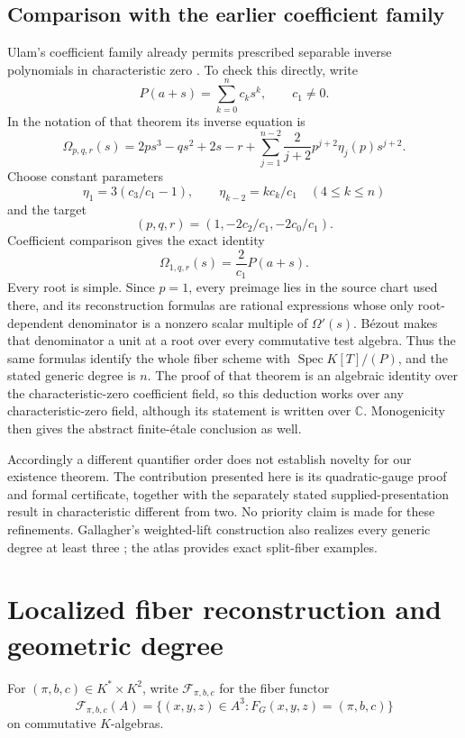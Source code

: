 \subsection{Comparison with the earlier coefficient family}\label{sec:ulam-comparison}

Ulam's coefficient family already permits prescribed separable inverse
polynomials in characteristic zero \cite[Theorem~5.2]{Ulam}. To check this
directly, write
\[
 P(a+s)=\sum_{k=0}^n c_ks^k,\qquad c_1\ne0.
\]
In the notation of that theorem its inverse equation is
\[
 \Omega_{p,q,r}(s)=2ps^3-qs^2+2s-r+
 \sum_{j=1}^{n-2}\frac{2}{j+2}p^{j+2}\eta_j(p)s^{j+2}.
\]
Choose constant parameters
\[
 \eta_1=3(c_3/c_1-1),\qquad
 \eta_{k-2}=k c_k/c_1\quad(4\le k\le n)
\]
and the target
\[
 (p,q,r)=(1,-2c_2/c_1,-2c_0/c_1).
\]
Coefficient comparison gives the exact identity
\[
 \Omega_{1,q,r}(s)=\frac{2}{c_1}P(a+s).
\]
Every root is simple. Since $p=1$, every preimage lies in the source chart
used there, and its reconstruction formulas are rational expressions whose
only root-dependent denominator is a nonzero scalar multiple of
$\Omega'(s)$. B\'ezout makes that denominator a unit at a root over every
commutative test algebra. Thus the same formulas identify the whole fiber
scheme with $\operatorname{Spec}K[T]/(P)$, and the stated generic degree is
$n$. The proof of that theorem is an algebraic identity over the
characteristic-zero coefficient field, so this deduction works over any
characteristic-zero field, although its statement is written over $\mathbb C$.
Monogenicity then gives the abstract finite-\'etale conclusion as well.

Accordingly a different quantifier order does not establish novelty for
our existence theorem. The contribution presented here is its
quadratic-gauge proof and formal certificate, together with the separately
stated supplied-presentation result in characteristic different from two.
No priority claim is made for these refinements. Gallagher's weighted-lift
construction also realizes every generic degree at least three
\cite[Section~7]{GallagherConstruction}; the atlas \cite{Gallagher}
provides exact split-fiber examples.

\section{Localized fiber reconstruction and geometric degree}
\label{sec:reconstruction}

For $(\pi,b,c)\in K^*\times K^2$, write $\mathcal F_{\pi,b,c}$ for the fiber
functor
\[
 \mathcal F_{\pi,b,c}(A)
 =\{(x,y,z)\in A^3:F_G(x,y,z)=(\pi,b,c)\}
\]
on commutative $K$-algebras.

